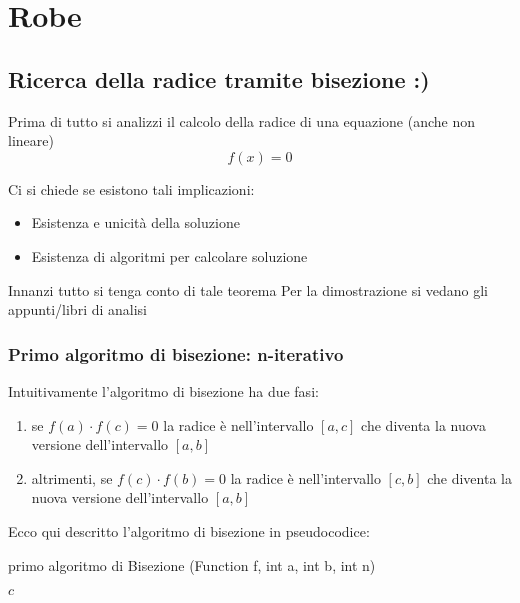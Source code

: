 \section{Robe}



\subsection{Ricerca della radice tramite bisezione :)}

Prima di tutto si analizzi il calcolo della radice di una equazione (anche non lineare)
\[
f(x)=0
\]

Ci si chiede se esistono tali implicazioni:
\begin{itemize}
    \item Esistenza e unicità della soluzione
    \item Esistenza di algoritmi per calcolare soluzione
\end{itemize}

Innanzi tutto si tenga conto di tale teorema 
Per la dimostrazione si vedano gli appunti/libri di analisi

\subsubsection{Primo algoritmo di bisezione: n-iterativo}
Intuitivamente l'algoritmo di bisezione ha due fasi:
\begin{enumerate}
    \item se $f(a)\cdot f(c)=0$ la radice è nell'intervallo $[a,c]$ che diventa la nuova versione dell'intervallo $[a,b]$
    \item altrimenti, se  $f(c) \cdot f(b)=0$ la radice è nell'intervallo $[c,b]$ che diventa la nuova versione dell'intervallo $[a,b]$
\end{enumerate}

Ecco qui descritto l'algoritmo di bisezione in pseudocodice:

\begin{algorithm}
    \caption{primo algoritmo di Bisezione (Function f, int a, int b, int n)}



    \Return $c$
\end{algorithm}

